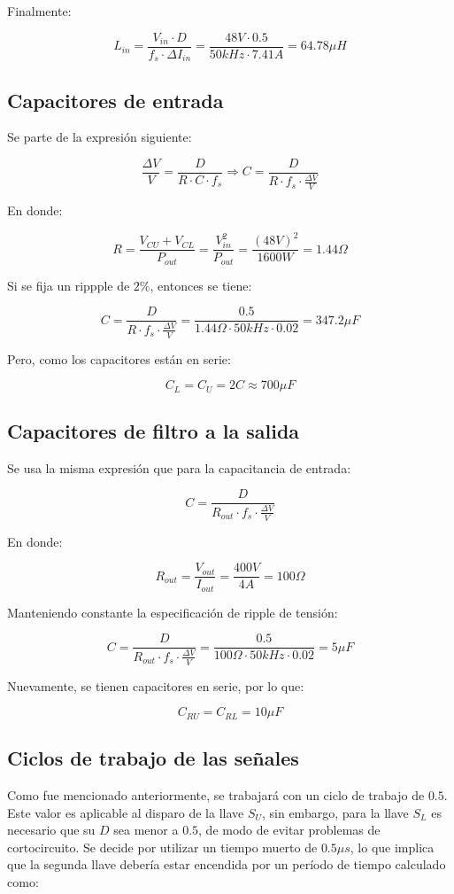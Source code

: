 Finalmente:

$$
L_{in}=\frac{V_{in}\cdot D}{f_s \cdot \Delta I_{in}}=\frac{48V\cdot 0.5}{50kHz\cdot 7.41A}=64.78 \mu H
$$

\subsection{Capacitores de entrada}

Se parte de la expresión siguiente:

$$
\frac{\Delta V}{V}=\frac{D}{R \cdot C \cdot f_s}\Rightarrow C=\frac{D}{R \cdot f_s \cdot \frac{\Delta V}{V}}
$$

En donde:

$$
R=\frac{V_{CU}+V_{CL}}{P_{out}}=\frac{V_{in}^2}{P_{out}}=\frac{(48V)^2}{1600W}=1.44\Omega
$$

Si se fija un rippple de $2\%$, entonces se tiene:

$$
C=\frac{D}{R \cdot f_s \cdot \frac{\Delta V}{V}} = \frac{0.5}{1.44 \Omega \cdot 50kHz \cdot 0.02 }=347.2 \mu F
$$

Pero, como los capacitores están en serie:

$$
C_L=C_U=2C \approx 700 \mu F
$$

\subsection{Capacitores de filtro a la salida}

Se usa la misma expresión que para la capacitancia de entrada:

$$
C=\frac{D}{R_{out} \cdot f_s \cdot \frac{\Delta V}{V}}
$$

En donde:

$$
R_{out}=\frac{V_{out}}{I_{out}}=\frac{400V}{4A}=100 \Omega
$$

Manteniendo constante la especificación de ripple de tensión:

$$
C=\frac{D}{R_{out} \cdot f_s \cdot \frac{\Delta V}{V}}=\frac{0.5}{100\Omega \cdot 50kHz \cdot 0.02}=5 \mu F
$$

Nuevamente, se tienen capacitores en serie, por lo que:

$$
C_{RU}=C_{RL}=10 \mu F
$$

\subsection{Ciclos de trabajo de las señales}

Como fue mencionado anteriormente, se trabajará con un ciclo de trabajo de $0.5$. Este valor es aplicable al disparo de la llave $S_U$, sin embargo, para la llave $S_L$ es necesario que su $D$ sea menor a $0.5$, de modo de evitar problemas de cortocircuito. Se decide por utilizar un tiempo muerto de $0.5 \mu s$, lo que implica que la segunda llave debería estar encendida por un período de tiempo calculado como:

